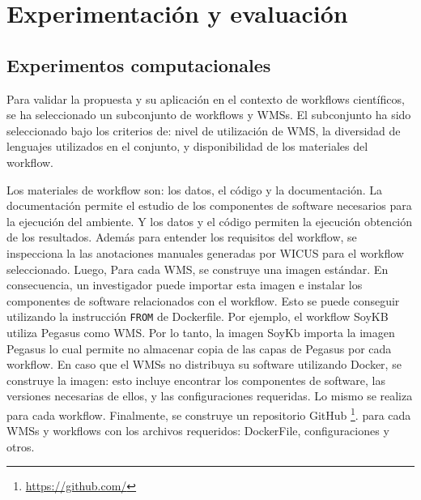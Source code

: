 \chapter{Experimentación y evaluación}

\section{Experimentos computacionales}\label{s5.1}

Para validar la propuesta y su aplicación en el contexto de workflows científicos, se ha seleccionado un subconjunto de workflows y WMSs. 
El subconjunto ha sido seleccionado bajo los criterios de: nivel de utilización de WMS, la diversidad de lenguajes utilizados en el conjunto, y disponibilidad de los materiales del workflow. 

Los materiales de workflow son: los datos, el código y la documentación. La documentación permite el estudio de los componentes de software necesarios para la ejecución del ambiente. Y los datos y el código permiten la ejecución obtención de los resultados.
Además para entender los requisitos del workflow, se inspecciona la las anotaciones manuales generadas por WICUS \cite{santana2017reproducibility} para el workflow seleccionado.
Luego, Para cada WMS, se construye una imagen estándar. En consecuencia, un investigador puede importar esta imagen e instalar los componentes de software relacionados con el workflow.
Esto se puede conseguir utilizando la instrucción \texttt{FROM} de Dockerfile. Por ejemplo, el workflow SoyKB utiliza Pegasus como WMS. Por lo tanto, la imagen SoyKb importa la imagen Pegasus lo cual permite no almacenar copia de las capas de Pegasus por cada workflow.
En caso que el WMSs no distribuya su software utilizando Docker, se construye la imagen: esto incluye encontrar los componentes de software, las versiones necesarias de ellos, y las configuraciones requeridas. Lo mismo se realiza para cada workflow. 
Finalmente, se construye un repositorio GitHub \footnote{\url{https://github.com/}}. para cada WMSs y workflows con los archivos requeridos: DockerFile, configuraciones y otros.

